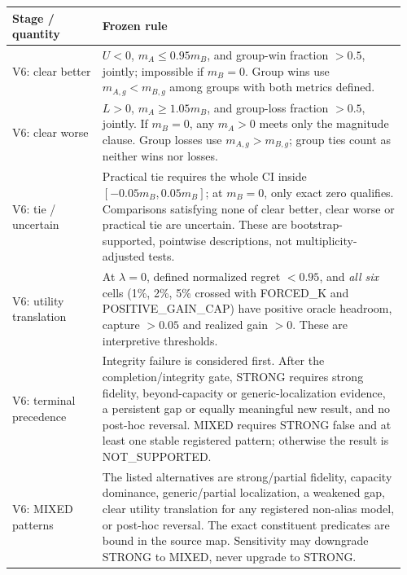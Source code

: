 \begin{center}\begin{minipage}{\linewidth}\small
{}\label{tab:stage-rules}
\begin{tabular}{@{}p{0.22\linewidth}p{0.74\linewidth}@{}}
\toprule
Stage / quantity & Frozen rule \\
\midrule
V6: clear better & $U<0$, $m_A\leq0.95m_B$, and group-win fraction $>0.5$, jointly; impossible if $m_B=0$. Group wins use $m_{A,g}<m_{B,g}$ among groups with both metrics defined.\\[3pt]
V6: clear worse & $L>0$, $m_A\geq1.05m_B$, and group-loss fraction $>0.5$, jointly. If $m_B=0$, any $m_A>0$ meets only the magnitude clause. Group losses use $m_{A,g}>m_{B,g}$; group ties count as neither wins nor losses.\\[3pt]
V6: tie / uncertain & Practical tie requires the whole CI inside $[-0.05m_B,0.05m_B]$; at $m_B=0$, only exact zero qualifies. Comparisons satisfying none of clear better, clear worse or practical tie are uncertain. These are bootstrap-supported, pointwise descriptions, not multiplicity-adjusted tests.\\[3pt]
V6: utility translation & At $\lambda=0$, defined normalized regret $<0.95$, and \emph{all six} cells (1\%, 2\%, 5\% crossed with FORCED\_K and POSITIVE\_GAIN\_CAP) have positive oracle headroom, capture $>0.05$ and realized gain $>0$. These are interpretive thresholds.\\[3pt]
V6: terminal precedence & Integrity failure is considered first. After the completion/integrity gate, STRONG requires strong fidelity, beyond-capacity or generic-localization evidence, a persistent gap or equally meaningful new result, and no post-hoc reversal. MIXED requires STRONG false and at least one stable registered pattern; otherwise the result is NOT\_SUPPORTED.\\[3pt]
V6: MIXED patterns & The listed alternatives are strong/partial fidelity, capacity dominance, generic/partial localization, a weakened gap, clear utility translation for any registered non-alias model, or post-hoc reversal. The exact constituent predicates are bound in the source map. Sensitivity may downgrade STRONG to MIXED, never upgrade to STRONG.\\[3pt]

\end{tabular}
\end{minipage}
\end{center}

